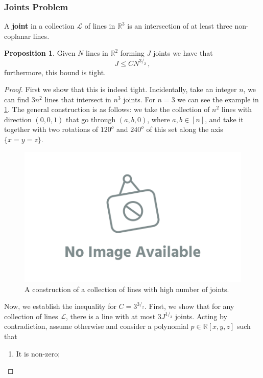 \documentclass[12pt]{amsart}
\theoremstyle{definition}
\newtheorem{prop}[thm]{Proposition}
\newcommand{\R}{\mathbb{R}}
\begin{document}
\subsubsection*{Joints Problem}




A \textbf{joint} in a collection $\mathcal L$ of lines in $\R^3$ is an intersection of at least three non-coplanar lines.


\begin{prop}
Given $N$ lines in $\R^2$ forming $J$ joints we have that
$$ J \leq C N^{3/_2}\, ,$$
furthermore, this bound is tight.
\end{prop}


\begin{proof}
First we show that this is indeed tight.
Incidentally, take an integer $n$, we can find $3n^2$ lines that intersect in $n^3$ joints. For $n=3$ we can see the example in \cref{fig:joints}.
The general construction is as follows: we take the collection of $n^2$ lines with direction $(0, 0, 1)$ that go through $(a, b, 0)$, where $a, b\in [n]$, and take it together with two rotations of $120^o$ and $240^o$ of this set along the axis $\{x = y = z\}$.

\begin{figure}[h]
\includegraphics[scale=.1]{../imgs/ina.png}%
\caption{A construction of a collection of lines with high number of joints.\label{fig:joints}}
\end{figure}

Now, we establish the inequality for $C = 3^{3/_2}$.
First, we show that for any collection of lines $\mathcal L$, there is a line with at most $3 J^{1/_3}$ joints.
Acting by contradiction, assume otherwise and consider a polynomial $p \in \R[x, y, z]$ such that 
\begin{enumerate}
\item It is non-zero;


\end{enumerate}
\end{proof}
\end{document}
